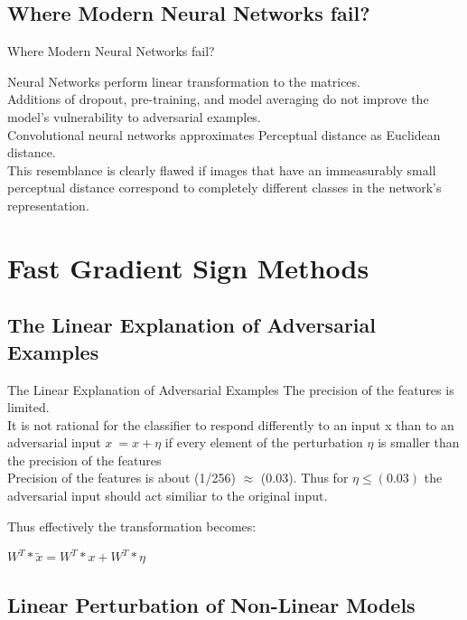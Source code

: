 \documentclass{beamer}
\begin{document}
\begin{darkframes}
    \subsection{Where Modern Neural Networks fail?}
    \begin{frame}{Where Modern Neural Networks fail?}
    
    
        Neural Networks perform linear transformation to the matrices.\\\bigskip
        Additions of dropout, pre-training, and model averaging do not improve the model’s vulnerability to adversarial examples.\\\bigskip
        Convolutional neural networks approximates Perceptual distance as Euclidean distance.\\\bigskip
        This resemblance is clearly flawed if images that have an
        immeasurably small perceptual distance correspond to completely different classes in the network’s representation.
        

    \end{frame}

    \section{Fast Gradient Sign Methods}
    \subsection{The Linear Explanation of Adversarial Examples}
    \begin{frame}{The Linear Explanation of Adversarial Examples}
        The precision of the features is limited.\\\bigskip
        It is not rational for the classifier to respond differently to an input x than to an adversarial input $ x~ = x + \eta$  if every element of the perturbation $\eta$ is smaller than the precision of the features\\\bigskip
        Precision of the features is about (1/256) $\approx$ (0.03).
        Thus for $\eta \leq (0.03)$ the adversarial input should act similiar to the original input.\\\bigskip
        
        Thus effectively the transformation becomes:\\
        \centerline{$ W^{T}*\widetilde{x} = W^{T}*x + W^{T}*\eta $}
    \end{frame}

    \subsection{Linear Perturbation of Non-Linear Models}
        

\end{darkframes}
\end{document}
